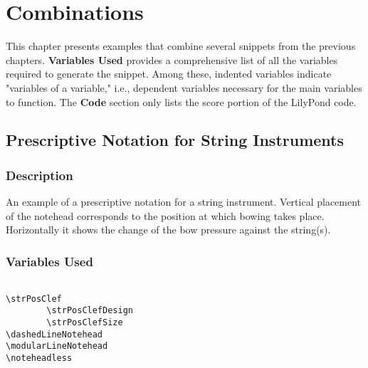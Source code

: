 

\chapter {Combinations}

This chapter presents examples that combine several snippets from the previous chapters. \textbf{Variables Used} provides a comprehensive list of all the variables required to generate the snippet. Among these, indented variables indicate "variables of a variable," i.e., dependent variables necessary for the main variables to function. The \textbf{Code} section only lists the score portion of the LilyPond code.

\section {Prescriptive Notation for String Instruments}
\label{sec:comb_strings}
\hfill
{}
\hfill

\subsection{Description}
An example of a prescriptive notation for a string instrument. Vertical placement of the notehead corresponds to the position at which bowing takes place. Horizontally it shows the change of the bow pressure against the string(s).
\subsection{Variables Used}
\begin{verbatim}

\strPosClef
		\strPosClefDesign
		\strPosClefSize
\dashedLineNotehead
\modularLineNotehead
\noteheadless
\end{verbatim}
